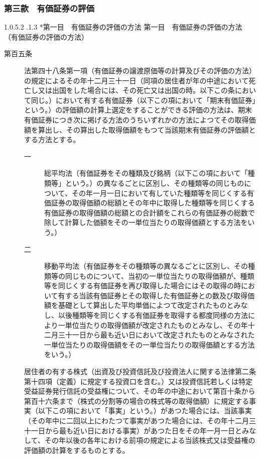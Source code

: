 \documentclass[twocolumn,a4j,10pt]{ltjtarticle}
\makeatletter
\newcommand{\subsubsubsection}{\@startsection{paragraph}{4}{\z@}%
  {1.0\Cvs \@plus.5\Cdp \@minus.2\Cdp}%
  {.1\Cvs \@plus.3\Cdp}%
  {\reset@font\sffamily\normalsize}
}
\makeatother
\begin{document}
\subsubsection*{第三款　有価証券の評価}
\subsubsubsection*{第一目　有価証券の評価の方法}
{第一目　有価証券の評価の方法}
\noindent\hspace{10pt}（有価証券の評価の方法）
\begin{description}
\item[第百五条]法第四十八条第一項（有価証券の譲渡原価等の計算及びその評価の方法）の規定によるその年十二月三十一日（同項の居住者が年の中途において死亡し又は出国をした場合には、その死亡又は出国の時。以下この条において同じ。）において有する有価証券（以下この項において「期末有価証券」という。）の評価額の計算上選定をすることができる評価の方法は、期末有価証券につき次に掲げる方法のうちいずれかの方法によつてその取得価額を算出し、その算出した取得価額をもつて当該期末有価証券の評価額とする方法とする。
\begin{description}
\item[一]総平均法（有価証券をその種類及び銘柄（以下この項において「種類等」という。）の異なるごとに区別し、その種類等の同じものについて、その年一月一日において有していた種類等を同じくする有価証券の取得価額の総額とその年中に取得した種類等を同じくする有価証券の取得価額の総額との合計額をこれらの有価証券の総数で除して計算した価額をその一単位当たりの取得価額とする方法をいう。）
\item[二]移動平均法（有価証券をその種類等の異なるごとに区別し、その種類等の同じものについて、当初の一単位当たりの取得価額が、種類等を同じくする有価証券を再び取得した場合にはその取得の時において有する当該有価証券とその取得した有価証券との数及び取得価額を基礎として算出した平均単価によつて改定されたものとみなし、以後種類等を同じくする有価証券を取得する都度同様の方法により一単位当たりの取得価額が改定されたものとみなし、その年十二月三十一日から最も近い日において改定されたものとみなされた一単位当たりの取得価額をその一単位当たりの取得価額とする方法をいう。）
\end{description}
\item[]居住者の有する株式（出資及び投資信託及び投資法人に関する法律第二条第十四項（定義）に規定する投資口を含む。）又は投資信託若しくは特定受益証券発行信託の受益権について、その年の中途において第百十条から第百十六条まで（株式の分割等の場合の株式等の取得価額）に規定する事実（以下この項において「事実」という。）があつた場合には、当該事実（その年中に二回以上にわたつて事実があつた場合には、その年十二月三十一日から最も近い日における事実）があつた日をその年一月一日とみなして、その年以後の各年における前項の規定による当該株式又は受益権の評価額の計算をするものとする。
\end{description}
\end{document}
